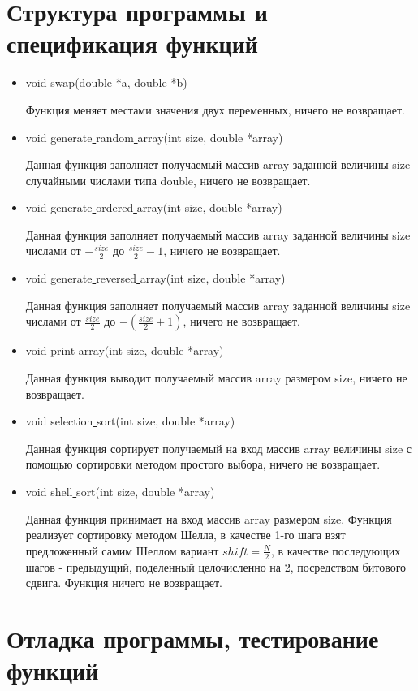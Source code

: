 \documentclass[a4paper,12pt,titlepage,finall]{article}
\begin{document}
\newpage

\section{Структура программы и спецификация функций}
\begin{itemize}
\item void swap(double *a, double *b) \par
	Функция меняет местами значения двух переменных, ничего не возвращает.
\item void generate\underline{ }random\underline{ }array(int size, double *array) \par
	 Данная функция заполняет получаемый массив array заданной величины size случайными числами типа double, ничего не возвращает.
\item void generate\underline{ }ordered\underline{ }array(int size, double *array) \par
	Данная функция заполняет получаемый массив array заданной величины size числами от $-\frac{size}{2}$ до $\frac{size}{2} - 1$, ничего не возвращает.
\item void generate\underline{ }reversed\underline{ }array(int size, double *array) \par
	Данная функция заполняет получаемый массив array заданной величины size числами от $\frac{size}{2}$ до $-(\frac{size}{2} + 1)$, ничего не возвращает.
\item void print\underline{ }array(int size, double *array) \par
	Данная функция выводит получаемый массив array размером size, ничего не возвращает.
\item void selection\underline{ }sort(int size, double *array) \par
	Данная функция сортирует получаемый на вход массив array величины size с помощью сортировки методом простого выбора, ничего не возвращает.
\item void shell\underline{ }sort(int size, double *array) \par
	Данная функция принимает на вход массив array размером size. Функция реализует сортировку методом Шелла, в качестве 1-го шага взят предложенный самим Шеллом вариант $shift={\frac{N}{2}}$, в качестве последующих шагов - предыдущий, поделенный целочисленно на 2, посредством битового сдвига. Функция ничего не возвращает.	
\end{itemize}
\newpage

\section{Отладка программы, тестирование функций}
\end{document}
